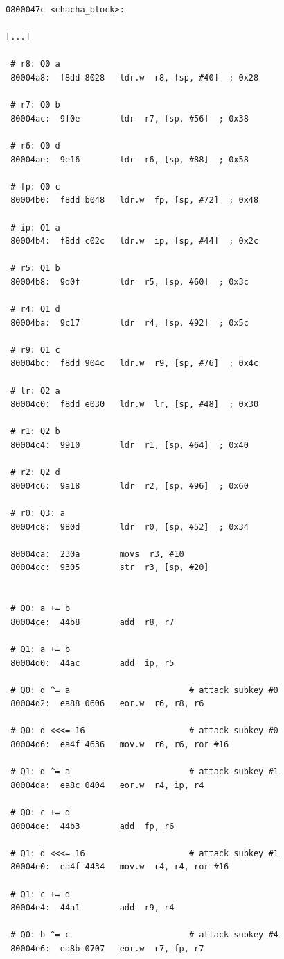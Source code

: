 \documentclass[a4paper,ngerman]{scrreprt}
\begin{document}
\begin{lstlisting}[caption={Assembler-Code, optimiert (-Os)}, label=lst:asm-optimized]
0800047c <chacha_block>:

[...]

 # r8: Q0 a
 80004a8:  f8dd 8028   ldr.w  r8, [sp, #40]  ; 0x28

 # r7: Q0 b
 80004ac:  9f0e        ldr  r7, [sp, #56]  ; 0x38

 # r6: Q0 d
 80004ae:  9e16        ldr  r6, [sp, #88]  ; 0x58

 # fp: Q0 c
 80004b0:  f8dd b048   ldr.w  fp, [sp, #72]  ; 0x48

 # ip: Q1 a
 80004b4:  f8dd c02c   ldr.w  ip, [sp, #44]  ; 0x2c

 # r5: Q1 b
 80004b8:  9d0f        ldr  r5, [sp, #60]  ; 0x3c

 # r4: Q1 d
 80004ba:  9c17        ldr  r4, [sp, #92]  ; 0x5c

 # r9: Q1 c
 80004bc:  f8dd 904c   ldr.w  r9, [sp, #76]  ; 0x4c

 # lr: Q2 a
 80004c0:  f8dd e030   ldr.w  lr, [sp, #48]  ; 0x30

 # r1: Q2 b
 80004c4:  9910        ldr  r1, [sp, #64]  ; 0x40

 # r2: Q2 d
 80004c6:  9a18        ldr  r2, [sp, #96]  ; 0x60

 # r0: Q3: a
 80004c8:  980d        ldr  r0, [sp, #52]  ; 0x34

 80004ca:  230a        movs  r3, #10
 80004cc:  9305        str  r3, [sp, #20]


 # Q0: a += b
 80004ce:  44b8        add  r8, r7

 # Q1: a += b
 80004d0:  44ac        add  ip, r5

 # Q0: d ^= a                        # attack subkey #0
 80004d2:  ea88 0606   eor.w  r6, r8, r6

 # Q0: d <<<= 16                     # attack subkey #0
 80004d6:  ea4f 4636   mov.w  r6, r6, ror #16

 # Q1: d ^= a                        # attack subkey #1
 80004da:  ea8c 0404   eor.w  r4, ip, r4

 # Q0: c += d
 80004de:  44b3        add  fp, r6

 # Q1: d <<<= 16                     # attack subkey #1
 80004e0:  ea4f 4434   mov.w  r4, r4, ror #16

 # Q1: c += d
 80004e4:  44a1        add  r9, r4

 # Q0: b ^= c                        # attack subkey #4
 80004e6:  ea8b 0707   eor.w  r7, fp, r7


\end{lstlisting}
\end{document}
